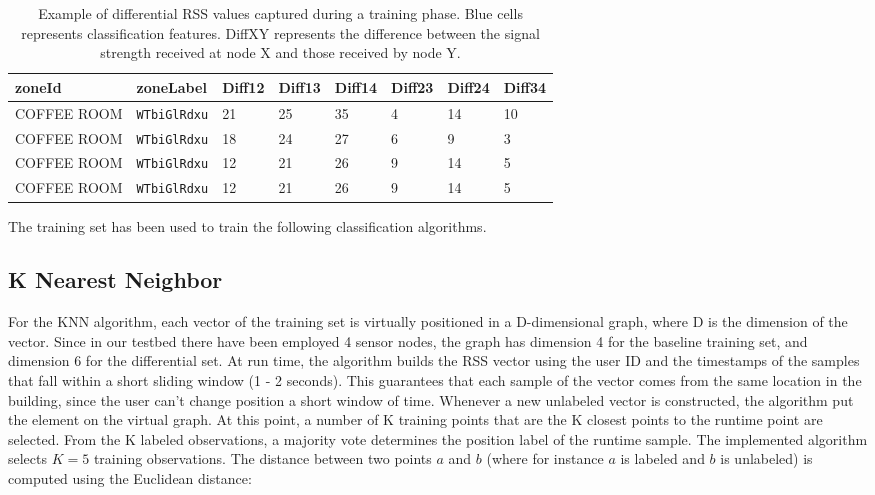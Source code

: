 \begin{table}[h!tb]
\caption[Example of differential RSS values captured during a training phase.]{Example of differential RSS values captured during a training phase. Blue cells represents classification features. DiffXY represents the difference between the signal strength received at node X and those received by node Y.}
\label{tab:sample-diff}
\begin{center}
\setlength{\tabcolsep}{.35em}
  \begin{tabularx}{\textwidth}{ | Y | a | a | a | a | a | a | a |}
    \hline
    zoneId & zoneLabel & Diff12 & Diff13 & Diff14 & Diff23 & Diff24 & Diff34\\ \hline
    COFFEE ROOM & \verb|WTbiGlRdxu| & 21 & 25 & 35 & 4 & 14 & 10\\
    COFFEE ROOM & \verb|WTbiGlRdxu| & 18 & 24 & 27 & 6 & 9 & 3\\
    COFFEE ROOM & \verb|WTbiGlRdxu| & 12 & 21 & 26 & 9 & 14 & 5\\
    COFFEE ROOM & \verb|WTbiGlRdxu| & 12 & 21 & 26 & 9 & 14 & 5\\
    \hline
  \end{tabularx}
\end{center}
\end{table}

The training set has been used to train the following classification algorithms.

\subsection{K Nearest Neighbor}
\label{subsec:knn}
For the KNN algorithm, each vector of the training set is virtually positioned in a D-dimensional graph, where D is the dimension of the vector. Since in our testbed there have been employed 4 sensor nodes, the graph has dimension 4 for the baseline training set, and dimension 6 for the differential set.
At run time, the algorithm builds the RSS vector using the user ID and the timestamps of the samples that fall within a short sliding window (1 - 2 seconds). This guarantees that each sample of the vector comes from the same location in the building, since the user can't change position a short window of time.
Whenever a new unlabeled vector is constructed, the algorithm put the element on the virtual graph. At this point, a number of K training points that are the K closest points to the runtime point are selected. From the K labeled observations, a majority vote determines the position label of the runtime sample. The implemented algorithm selects $K=5$ training observations.
The distance between two points $a$ and $b$ (where for instance $a$ is labeled and $b$ is unlabeled) is computed using the Euclidean distance:

